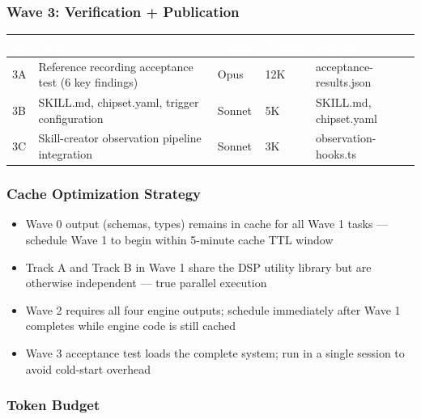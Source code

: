 \documentclass[11pt,letterpaper]{article}
\newcommand{\tableheader}[1]{\textbf{\sffamily\textcolor{white}{#1}}}
\begin{document}
\subsubsection{Wave 3: Verification + Publication}

\begin{center}
\begin{tabularx}{\textwidth}{C{0.8cm}L{3cm}L{2cm}C{1.5cm}X}
\toprule
{}
\tableheader{ID} & \tableheader{Task} & \tableheader{Model} & \tableheader{Tokens} & \tableheader{Output} \\
\midrule
3A & Reference recording acceptance test (6 key findings) & Opus & 12K & acceptance-results.json \\
3B & SKILL.md, chipset.yaml, trigger configuration & Sonnet & 5K & SKILL.md, chipset.yaml \\
3C & Skill-creator observation pipeline integration & Sonnet & 3K & observation-hooks.ts \\
\bottomrule
\end{tabularx}
\end{center}

\subsubsection{Cache Optimization Strategy}

\begin{itemize}[leftmargin=2em]
\item Wave 0 output (schemas, types) remains in cache for all Wave 1 tasks --- schedule Wave 1 to begin within 5-minute cache TTL window
\item Track A and Track B in Wave 1 share the DSP utility library but are otherwise independent --- true parallel execution
\item Wave 2 requires all four engine outputs; schedule immediately after Wave 1 completes while engine code is still cached
\item Wave 3 acceptance test loads the complete system; run in a single session to avoid cold-start overhead
\end{itemize}

\subsubsection{Token Budget}
\end{document}
